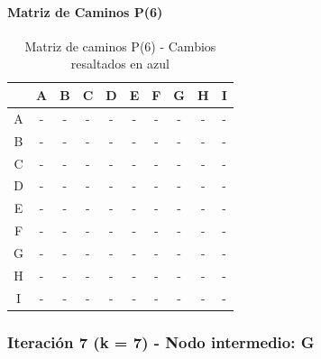 \documentclass[12pt]{article}
\begin{document}
\paragraph{Matriz de Caminos P(6)}
\begin{table}[h!]
\centering
\begin{tabular}{|c|c|c|c|c|c|c|c|c|c|}
\hline
 & A & B & C & D & E & F & G & H & I \\\hline
A & - & - & - & - & - & - & - & - & - \\\hline
B & - & - & - & - & - & - & - & - & - \\\hline
C & - & - & - & - & - & - & - & - & - \\\hline
D & - & - & - & - & - & - & - & - & - \\\hline
E & - & - & - & - & - & - & - & - & - \\\hline
F & - & - & - & - & - & - & - & - & - \\\hline
G & - & - & - & - & - & - & - & - & - \\\hline
H & - & - & - & - & - & - & - & - & - \\\hline
I & - & - & - & - & - & - & - & - & - \\\hline
\end{tabular}
\caption{Matriz de caminos P(6) - Cambios resaltados en azul}
\end{table}

\subsubsection{Iteración 7 (k = 7) - Nodo intermedio: G}
\end{document}
